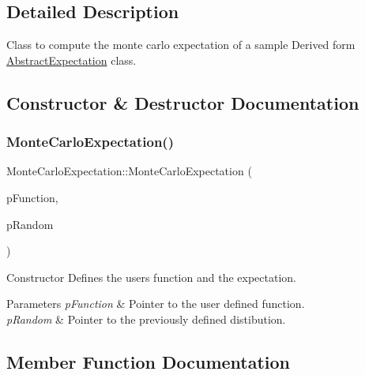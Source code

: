 \subsection{Detailed Description}
Class to compute the monte carlo expectation of a sample Derived form \hyperlink{classAbstractExpectation}{Abstract\+Expectation} class. 

\subsection{Constructor \& Destructor Documentation}
\mbox{\label{classMonteCarloExpectation_ad595bc1f4a61d0138fd1d55e11b4d267}} 
\subsubsection{\texorpdfstring{Monte\+Carlo\+Expectation()}{MonteCarloExpectation()}}
{\footnotesize\ttfamily Monte\+Carlo\+Expectation\+::\+Monte\+Carlo\+Expectation (\begin{DoxyParamCaption}\item[{\hyperlink{classAbstractFunc}{Abstract\+Func} $\ast$}]{p\+Function,  }\item[{const \hyperlink{classAbstractVariable}{Abstract\+Variable} $\ast$}]{p\+Random }\end{DoxyParamCaption})}



Constructor Defines the user\textquotesingle{}s function and the expectation. 


\begin{DoxyParams}{Parameters}
{\em p\+Function} & Pointer to the user defined function. \\
\hline
{\em p\+Random} & Pointer to the previously defined distibution. \\
\hline
\end{DoxyParams}


\subsection{Member Function Documentation}
\mbox{\label{classMonteCarloExpectation_a6f4489cc63ca48fcbf5f2cdd6258dfcc}} 
